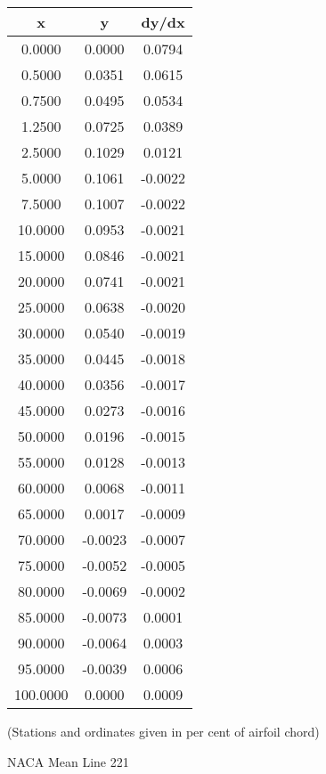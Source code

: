\documentclass[11pt]{book}
\begin{document}
 \vspace{8mm}
 \begin{tabular}{|c|c|c|}  \hline
 x & y & dy/dx \\
 \hline
0.0000 & 0.0000 & 0.0794 \\
0.5000 & 0.0351 & 0.0615 \\
0.7500 & 0.0495 & 0.0534 \\
1.2500 & 0.0725 & 0.0389 \\
2.5000 & 0.1029 & 0.0121 \\
5.0000 & 0.1061 & -0.0022 \\
7.5000 & 0.1007 & -0.0022 \\
10.0000 & 0.0953 & -0.0021 \\
15.0000 & 0.0846 & -0.0021 \\
20.0000 & 0.0741 & -0.0021 \\
25.0000 & 0.0638 & -0.0020 \\
30.0000 & 0.0540 & -0.0019 \\
35.0000 & 0.0445 & -0.0018 \\
40.0000 & 0.0356 & -0.0017 \\
45.0000 & 0.0273 & -0.0016 \\
50.0000 & 0.0196 & -0.0015 \\
55.0000 & 0.0128 & -0.0013 \\
60.0000 & 0.0068 & -0.0011 \\
65.0000 & 0.0017 & -0.0009 \\
70.0000 & -0.0023 & -0.0007 \\
75.0000 & -0.0052 & -0.0005 \\
80.0000 & -0.0069 & -0.0002 \\
85.0000 & -0.0073 & 0.0001 \\
90.0000 & -0.0064 & 0.0003 \\
95.0000 & -0.0039 & 0.0006 \\
100.0000 & 0.0000 & 0.0009 \\
 \hline
 \end{tabular}
 \vspace{8mm}

(Stations and ordinates given in per cent of airfoil chord)

 \newpage
 \label{ml221}
 \begin{Large}
 NACA Mean Line 221
 \end{Large}
  
\end{document}
